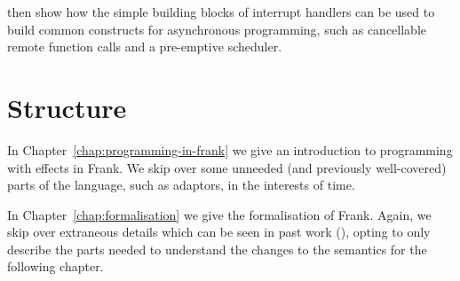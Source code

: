 \documentclass[msc,deptreport,cs]{infthesis} %
\newcommand\aeff{{\AE}ff\xspace}
\newcommand{\todo}[1]
           {{\par\noindent\small\color{RoyalPurple}
  \framebox{\parbox{\dimexpr\linewidth-2\fboxsep-2\fboxrule}
    {\textbf{TODO:} #1}}}}
\begin{document}
\citeauthor{ahman2020asynchronous} then show how the simple building blocks of
interrupt handlers can be used to build common constructs for asynchronous
programming, such as cancellable remote function calls and a pre-emptive
scheduler.


%





\section{Structure}

In Chapter~\ref{chap:programming-in-frank} we give an introduction to
programming with effects in Frank. We skip over some unneeded (and previously
well-covered) parts of the language, such as adaptors, in the interests of time.

In Chapter~\ref{chap:formalisation} we give the formalisation of Frank. Again,
we skip over extraneous details which can be seen in past work
(\cite{convent2020doo}), opting to only describe the parts needed to understand
the changes to the semantics for the following chapter.
\end{document}
